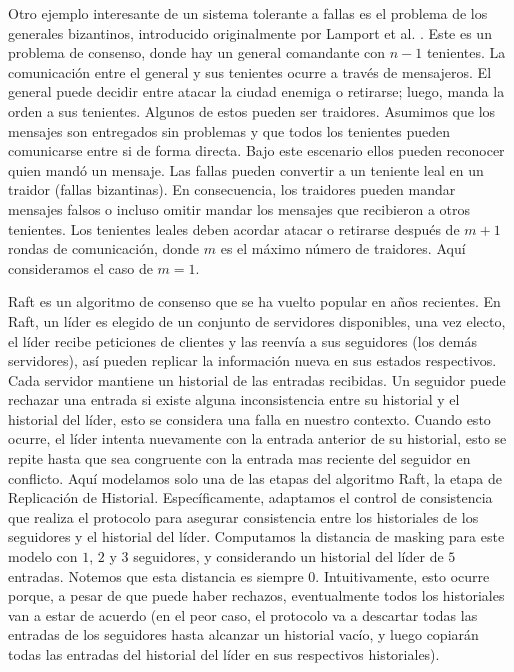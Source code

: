 Otro ejemplo interesante de un sistema tolerante a fallas es el problema de los generales bizantinos, introducido originalmente por Lamport et al. \cite{LamportSP82}. Este es un problema de consenso, donde hay un general comandante con $n-1$ tenientes. La comunicación entre el general y sus tenientes ocurre a través de mensajeros. El general puede decidir entre atacar la ciudad enemiga o retirarse; luego, manda la orden a sus tenientes. Algunos de estos pueden ser traidores. 
Asumimos que los mensajes son entregados sin problemas y que todos los tenientes pueden comunicarse entre si de forma directa. Bajo este escenario ellos pueden reconocer quien mandó un mensaje. Las fallas pueden convertir a un teniente leal en un traidor (fallas bizantinas). En consecuencia, los traidores pueden mandar mensajes falsos o incluso omitir mandar los mensajes que recibieron a otros tenientes. Los tenientes leales deben acordar atacar o retirarse después de $m + 1$ rondas de comunicación, donde $m$ es el máximo número de traidores. Aquí consideramos el caso de $m=1$.  


Raft \cite{OngaroO14} es un algoritmo de consenso que se ha vuelto popular en años recientes. En Raft, un líder es elegido de un conjunto de servidores disponibles, una vez electo, el líder recibe peticiones de clientes y las reenvía a sus seguidores (los demás servidores), así pueden replicar la información nueva en sus estados respectivos. Cada servidor mantiene un historial de las entradas recibidas. Un seguidor puede rechazar una entrada si existe alguna inconsistencia entre su historial y el historial del líder, esto se considera una falla en nuestro contexto. Cuando esto ocurre, el líder intenta nuevamente con la entrada anterior de su historial, esto se repite hasta que sea congruente con la entrada mas reciente del seguidor en conflicto. Aquí modelamos solo una de las etapas del algoritmo Raft, la etapa de Replicación de Historial. Específicamente, adaptamos el control de consistencia que realiza el protocolo para asegurar consistencia entre los historiales de los seguidores y el historial del líder. Computamos la distancia de masking para este modelo con $1$, $2$ y $3$ seguidores, y considerando un historial del líder de $5$ entradas. Notemos que esta distancia es siempre $0$. Intuitivamente, esto ocurre porque, a pesar de que puede haber rechazos, eventualmente todos los historiales van a estar de acuerdo (en el peor caso, el protocolo va a descartar todas las entradas de los seguidores hasta alcanzar un historial vacío, y luego copiarán todas las entradas del historial del líder en sus respectivos historiales). 

